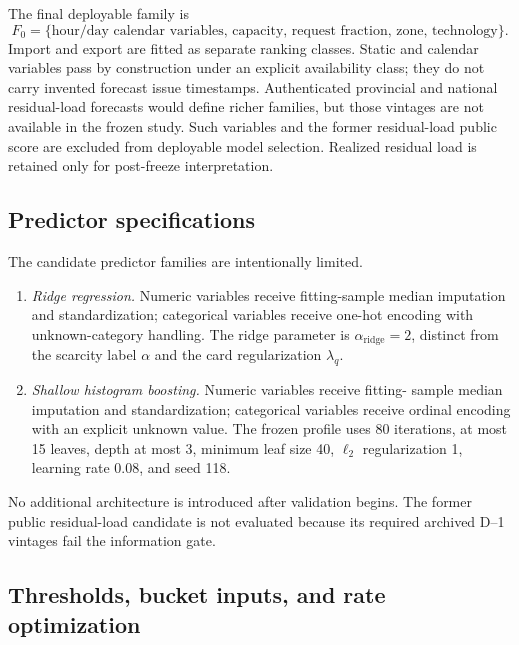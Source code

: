 \documentclass[10pt,journal,onecolumn]{IEEEtran}
\begin{document}
The final deployable family is
\begin{equation}
F_0=\{\text{hour/day calendar variables, capacity, request fraction,
zone, technology}\}.
\label{eq:report_F0}
\end{equation}
Import and export are fitted as separate ranking classes. Static and calendar
variables pass by construction under an explicit availability class; they do
not carry invented forecast issue timestamps. Authenticated provincial and
national residual-load forecasts would define richer families, but those
vintages are not available in the frozen study. Such variables and the former
residual-load public score are excluded from deployable model selection.
Realized residual load is retained only for post-freeze interpretation.

\subsection{Predictor specifications}

The candidate predictor families are intentionally limited.
\begin{enumerate}[leftmargin=*,itemsep=3pt]
\item \emph{Ridge regression.} Numeric variables receive fitting-sample median
imputation and standardization; categorical variables receive one-hot encoding
with unknown-category handling. The ridge parameter is
$\alpha_{\mathrm{ridge}}=2$, distinct from the scarcity label $\alpha$ and the
card regularization $\lambda_q$.
\item \emph{Shallow histogram boosting.} Numeric variables receive fitting-
sample median imputation and standardization; categorical variables receive
ordinal encoding with an explicit unknown value. The frozen profile uses 80
iterations, at most 15 leaves, depth at most 3, minimum leaf size 40,
$\ell_2$ regularization 1, learning rate 0.08, and seed 118.
\end{enumerate}
No additional architecture is introduced after validation begins. The former
public residual-load candidate is not evaluated because its required archived
D--1 vintages fail the information gate.

\subsection{Thresholds, bucket inputs, and rate optimization}
\end{document}
